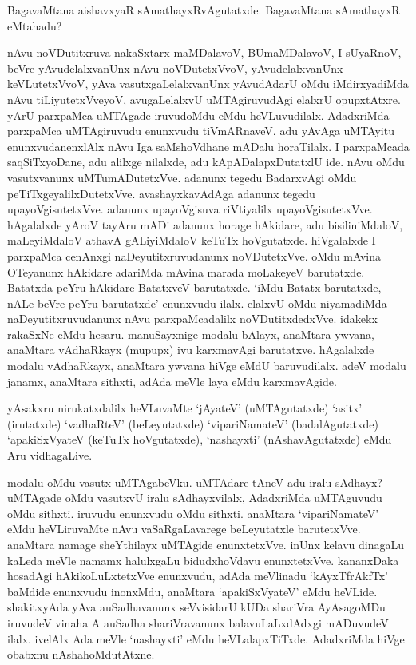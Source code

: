 BagavaMtana aishavxyaR sAmathayxRvAgutatxde. BagavaMtana sAmathayxR eMtahadu?

nAvu noVDutitxruva nakaSxtarx maMDalavoV, BUmaMDalavoV, I sUyaRnoV, beVre yAvudelalxvanUnx nAvu noVDutetxVvoV, yAvudelalxvanUnx keVLutetxVvoV, yAva vasutxgaLelalxvanUnx yAvudAdarU oMdu iMdirxyadiMda nAvu tiLiyutetxVveyoV, avugaLelalxvU uMTAgiruvudAgi elalxrU opupxtAtxre. yArU parxpaMca uMTAgade iruvudoMdu eMdu heVLuvudilalx. AdadxriMda parxpaMca uMTAgiruvudu enunxvudu tiVmARnaveV. adu yAvAga uMTAyitu enunxvudanenxlAlx nAvu Iga saMshoVdhane mADalu horaTilalx. I parxpaMcada saqSiTxyoDane, adu alilxge nilalxde, adu kApADalapxDutatxlU ide. nAvu oMdu vasutxvanunx uMTumADutetxVve. adanunx tegedu BadarxvAgi oMdu peTiTxgeyalilxDutetxVve. avashayxkavAdAga adanunx tegedu upayoVgisutetxVve. adanunx upayoVgisuva riVtiyalilx upayoVgisutetxVve. hAgalalxde yAroV tayAru mADi adanunx horage hAkidare, adu bisiliniMdaloV, maLeyiMdaloV athavA gALiyiMdaloV keTuTx hoVgutatxde. hiVgalalxde I parxpaMca cenAnxgi naDeyutitxruvudanunx noVDutetxVve. oMdu mAvina OTeyanunx hAkidare adariMda mAvina marada moLakeyeV barutatxde. Batatxda peYru hAkidare BatatxveV barutatxde. `iMdu Batatx barutatxde, nALe beVre peYru barutatxde' enunxvudu ilalx. elalxvU oMdu niyamadiMda naDeyutitxruvudanunx nAvu parxpaMcadalilx noVDutitxdedxVve. idakekx rakaSxNe eMdu hesaru. manuSayxnige modalu bAlayx, anaMtara ywvana, anaMtara vAdhaRkayx (mupupx) ivu karxmavAgi barutatxve. hAgalalxde modalu vAdhaRkayx, anaMtara ywvana hiVge eMdU baruvudilalx. adeV modalu janamx, anaMtara sithxti, adAda meVle laya eMdu karxmavAgide.

yAsakxru nirukatxdalilx heVLuvaMte `jAyateV' (uMTAgutatxde) `asitx' (irutatxde) `vadhaRteV' (beLeyutatxde) `vipariNamateV' (badalAgutatxde) `apakiSxVyateV (keTuTx hoVgutatxde), `nashayxti' (nAshavAgutatxde) eMdu Aru vidhagaLive.

modalu oMdu vasutx uMTAgabeVku. uMTAdare tAneV adu iralu sAdhayx? uMTAgade oMdu vasutxvU iralu sAdhayxvilalx, AdadxriMda uMTAguvudu oMdu sithxti. iruvudu enunxvudu oMdu sithxti. anaMtara `vipariNamateV' eMdu heVLiruvaMte nAvu {} vaSaRgaLavarege beLeyutatxle barutetxVve. anaMtara namage sheYthilayx uMTAgide enunxtetxVve. inUnx kelavu dinagaLu kaLeda meVle namamx halulxgaLu bidudxhoVdavu enunxtetxVve. kananxDaka hosadAgi hAkikoLuLxtetxVve enunxvudu, adAda meVlinadu `kAyxTfrAkfTx' baMdide enunxvudu inonxMdu, anaMtara `apakiSxVyateV' eMdu heVLide. shakitxyAda yAva auSadhavanunx seVvisidarU kUDa shariVra AyAsagoMDu iruvudeV vinaha A auSadha shariVravanunx balavuLaLxdAdxgi mADuvudeV ilalx. ivelAlx Ada meVle `nashayxti' eMdu heVLalapxTiTxde. AdadxriMda hiVge obabxnu nAshahoMdutAtxne.


